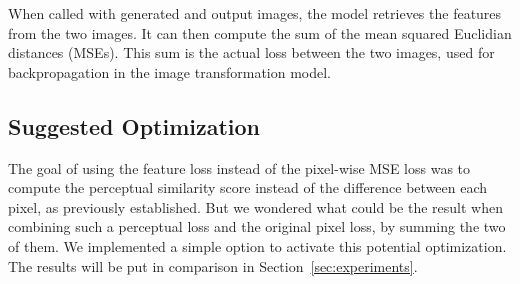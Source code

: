 \documentclass{article}
\begin{document}
{{        \bigskip

        When called with generated and output images, the model retrieves the features from the two images. It can then compute the sum of the mean squared Euclidian distances (MSEs). This sum is the actual loss between the two images, used for backpropagation in the image transformation model.
    }

    {
        \subsection{Suggested Optimization}
        \label{subsec:suggested-optimization}

        The goal of using the feature loss instead of the pixel-wise MSE loss was to compute the perceptual similarity score instead of the difference between each pixel, as previously established. But we wondered what could be the result when combining such a perceptual loss and the original pixel loss, by summing the two of them. We implemented a simple option to activate this potential optimization. The results will be put in comparison in Section~\ref{sec:experiments}.
    }
}
\end{document}
